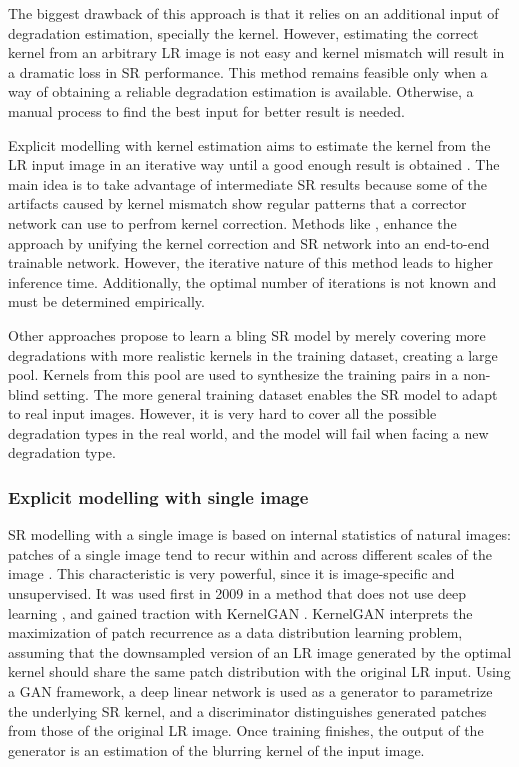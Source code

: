         The biggest drawback  of this approach is that it relies on an additional input of degradation estimation, specially the kernel. 
        However, estimating the correct kernel from an arbitrary LR image is not easy and kernel mismatch will result in a dramatic loss in SR performance.
        This method remains feasible only when a way of obtaining a reliable degradation estimation is available.
        Otherwise, a manual process to find the best input for better result is needed.
        
        Explicit modelling with kernel estimation aims to estimate the kernel from the LR input image in an iterative way until a good enough result is obtained \cite{gu2019blind}.
        The main idea is to take advantage of intermediate SR results because some of the artifacts caused by kernel mismatch show regular patterns that a corrector network can use to perfrom kernel correction.
        Methods like \cite{luo2020unfolding}, enhance the approach by unifying the kernel correction and SR network into an end-to-end trainable network. 
        However, the iterative nature of this method leads to higher inference time. Additionally, the optimal number of iterations is not known and must be determined empirically.

        Other approaches propose to learn a bling SR model by merely covering more degradations with more realistic kernels in the training dataset, creating a large pool.
        Kernels from this pool are used to synthesize the training pairs in a non-blind setting. 
        The more general training dataset enables the SR model to adapt to real input images. 
        However, it is very hard to cover all the possible degradation types in the real world, and the model will fail when facing a new degradation type.


        \subsubsection{Explicit modelling with single image}

        SR modelling with a single image is based on internal statistics of natural images: patches of a single image tend to recur within and across different scales of the image \cite{zontak2011}.
        This characteristic is very powerful, since it is image-specific and unsupervised. It was used first in 2009 in a method that does not use deep learning \cite{glasner2009}, and gained traction with KernelGAN \cite{bellkligler2020blind}. 
        KernelGAN interprets the maximization of patch recurrence as a data distribution learning problem, assuming that the downsampled version of an LR image generated by the optimal kernel should share the same patch distribution with the original LR input.
        Using a GAN framework, a deep linear network is used as a generator to parametrize the underlying SR kernel, and a discriminator distinguishes generated patches from those of the original LR image.
        Once training finishes, the output of the generator is an estimation of the blurring kernel of the input image. 

